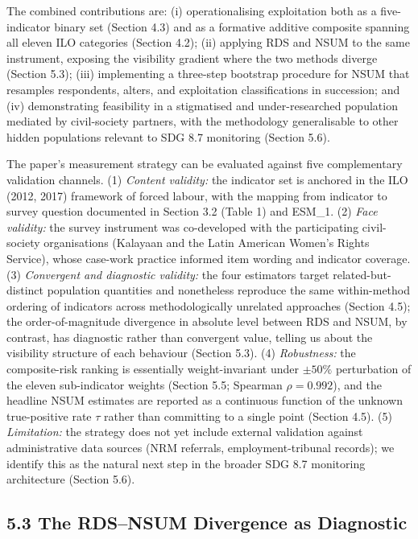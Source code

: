 \documentclass[
  12pt,
  letterpaper,
  DIV=11,
  numbers=noendperiod]{scrartcl}
\begin{document}
The combined contributions are: (i) operationalising exploitation both
as a five-indicator binary set (Section 4.3) and as a formative additive
composite spanning all eleven ILO categories (Section 4.2); (ii)
applying RDS and NSUM to the same instrument, exposing the visibility
gradient where the two methods diverge (Section 5.3); (iii) implementing
a three-step bootstrap procedure for NSUM that resamples respondents,
alters, and exploitation classifications in succession; and (iv)
demonstrating feasibility in a stigmatised and under-researched
population mediated by civil-society partners, with the methodology
generalisable to other hidden populations relevant to SDG 8.7 monitoring
(Section 5.6).

The paper's measurement strategy can be evaluated against five
complementary validation channels. (1) \emph{Content validity:} the
indicator set is anchored in the ILO (2012, 2017) framework of forced
labour, with the mapping from indicator to survey question documented in
Section 3.2 (Table 1) and ESM\_1. (2) \emph{Face validity:} the survey
instrument was co-developed with the participating civil-society
organisations (Kalayaan and the Latin American Women's Rights Service),
whose case-work practice informed item wording and indicator coverage.
(3) \emph{Convergent and diagnostic validity:} the four estimators
target related-but-distinct population quantities and nonetheless
reproduce the same within-method ordering of indicators across
methodologically unrelated approaches (Section 4.5); the
order-of-magnitude divergence in absolute level between RDS and NSUM, by
contrast, has diagnostic rather than convergent value, telling us about
the visibility structure of each behaviour (Section 5.3). (4)
\emph{Robustness:} the composite-risk ranking is essentially
weight-invariant under \(\pm 50\%\) perturbation of the eleven
sub-indicator weights (Section 5.5; Spearman \(\rho = 0.992\)), and the
headline NSUM estimates are reported as a continuous function of the
unknown true-positive rate \(\tau\) rather than committing to a single
point (Section 4.5). (5) \emph{Limitation:} the strategy does not yet
include external validation against administrative data sources (NRM
referrals, employment-tribunal records); we identify this as the natural
next step in the broader SDG 8.7 monitoring architecture (Section 5.6).

\subsection{5.3 The RDS--NSUM Divergence as
Diagnostic}\label{the-rdsnsum-divergence-as-diagnostic}
\end{document}
